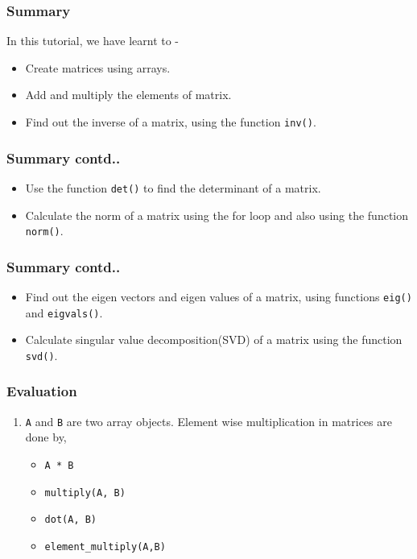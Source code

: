 \documentclass[17pt,compress]{beamer}
\newcounter{saveenumi}
\newcommand{\seti}{\setcounter{saveenumi}{\value{enumi}}}
\begin{document}
\begin{frame}
\frametitle{Summary}
\label{sec-11.1}

  In this tutorial, we have learnt to - 
  
\begin{itemize}
\item Create matrices using arrays.
\item Add and multiply the elements of matrix. 
\item Find out the inverse of a matrix, using the function \texttt{inv()}. 
\end{itemize}
\end{frame}
\begin{frame}
\frametitle{Summary contd..}
\label{sec-11.2}
\begin{itemize}
\item Use the function \texttt{det()} to find the determinant of a matrix. 
\item Calculate the norm of a matrix using the for loop and also using 
    the function \texttt{norm()}.
\end{itemize}
\end{frame}
\begin{frame}
\frametitle{Summary contd..}
\label{sec-11.3}
\begin{itemize}
\item Find out the eigen vectors and eigen values of a matrix, using 
    functions \texttt{eig()} and \texttt{eigvals()}. 
\item Calculate singular value decomposition(SVD) of a matrix using the 
    function \texttt{svd()}.
\end{itemize}
\end{frame}
\begin{frame}
\frametitle{Evaluation}
\label{sec-12.1}

\begin{enumerate}
\item \texttt{A} and \texttt{B} are two array objects. Element wise multiplication in
   matrices are done by,\pause
\begin{itemize}
\item \texttt{A * B}
\item \texttt{multiply(A, B)}
\item \texttt{dot(A, B)}
\item \texttt{element\_multiply(A,B)}\pause
\end{itemize}
\seti
\end{enumerate}
\end{frame}
\end{document}

